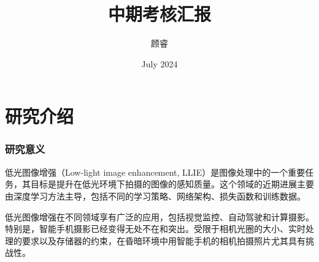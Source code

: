 \documentclass[a4paper]{ctexart}
\begin{document}
	
	
	\title{\songti {}中期考核汇报}
	\author{\textrm{顾睿}}
	\date{\textrm{July 2024}}
	\maketitle
	
	\newpage
	
	\renewcommand{\figurename}{图} %
	
	\renewcommand{\tablename}{表}
	
	\renewcommand{\contentsname}{目录}
	\renewcommand{\cfttoctitlefont}{\hfill\Large\bfseries}
	\renewcommand{\cftaftertoctitle}{\hfill}
	
	
	\tableofcontents  %
	
	\newpage	
	
	\part*{研究介绍}
	
	\section{研究意义}
	
	低光图像增强（Low-light image enhancement, LLIE）是图像处理中的一个重要任务，其目标是提升在低光环境下拍摄的图像的感知质量。这个领域的近期进展主要由深度学习方法主导，包括不同的学习策略、网络架构、损失函数和训练数据。
	
	低光图像增强在不同领域享有广泛的应用，包括视觉监控、自动驾驶和计算摄影。特别是，智能手机摄影已经变得无处不在和突出。受限于相机光圈的大小、实时处理的要求以及存储器的约束，在昏暗环境中用智能手机的相机拍摄照片尤其具有挑战性。
	
\end{document}
